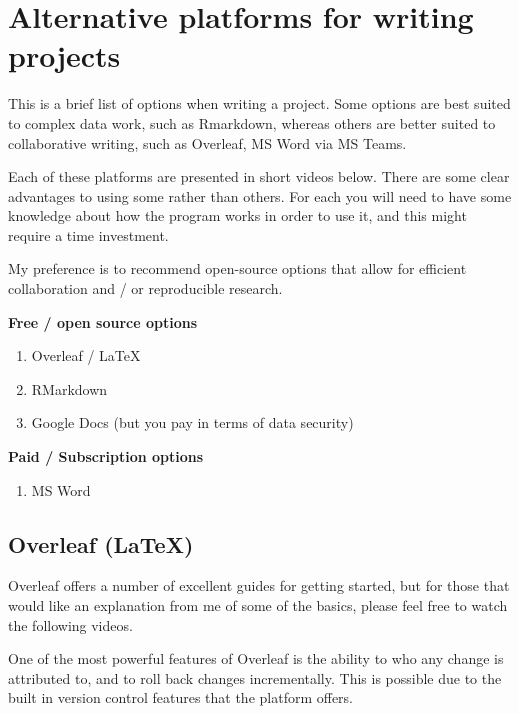 \documentclass[
]{book}
\providecommand{\tightlist}{%
  \setlength{\itemsep}{0pt}\setlength{\parskip}{0pt}}
\begin{document}
\hypertarget{alternative-platforms-for-writing-projects}{%
\chapter{Alternative platforms for writing projects}\label{alternative-platforms-for-writing-projects}}

This is a brief list of options when writing a project. Some options are best suited to complex data work, such as Rmarkdown, whereas others are better suited to collaborative writing, such as Overleaf, MS Word via MS Teams.

Each of these platforms are presented in short videos below. There are some clear advantages to using some rather than others. For each you will need to have some knowledge about how the program works in order to use it, and this might require a time investment.

My preference is to recommend open-source options that allow for efficient collaboration and / or reproducible research.

\textbf{Free / open source options}

\begin{enumerate}
\def\labelenumi{\arabic{enumi}.}
\item
  Overleaf / LaTeX
\item
  RMarkdown
\item
  Google Docs (but you pay in terms of data security)
\end{enumerate}

\textbf{Paid / Subscription options}

\begin{enumerate}
\def\labelenumi{\arabic{enumi}.}
\tightlist
\item
  MS Word
\end{enumerate}

\hypertarget{overleaf-latex}{%
\section{Overleaf (LaTeX)}\label{overleaf-latex}}

Overleaf offers a number of excellent guides for getting started, but for those that would like an explanation from me of some of the basics, please feel free to watch the following videos.

One of the most powerful features of Overleaf is the ability to who any change is attributed to, and to roll back changes incrementally. This is possible due to the built in version control features that the platform offers.
\end{document}
